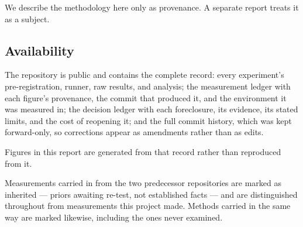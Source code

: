 We describe the methodology here only as provenance. A separate report treats it
as a subject.

\subsection{Availability}

The repository is public and contains the complete record: every experiment's
pre-registration, runner, raw results, and analysis; the measurement ledger with
each figure's provenance, the commit that produced it, and the environment it
was measured in; the decision ledger with each foreclosure, its evidence, its
stated limits, and the cost of reopening it; and the full commit history, which
was kept forward-only, so corrections appear as amendments rather than as edits.

Figures in this report are generated from that record rather than reproduced
from it.

Measurements carried in from the two predecessor repositories are marked as
inherited --- priors awaiting re-test, not established facts --- and are
distinguished throughout from measurements this project made. Methods carried in
the same way are marked likewise, including the ones never examined.
